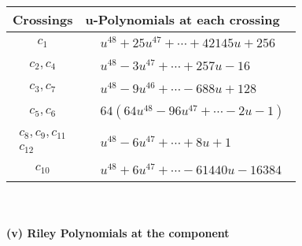 \documentclass[1p]{elsarticle_modified}
\theoremstyle{definition}
\begin{document}
\begin{tabular}{m{50pt}|m{274pt}}
Crossings & \hspace{64pt}u-Polynomials at each crossing \\
\hline $$\begin{aligned}c_{1}\end{aligned}$$&$\begin{aligned}
&u^{48}+25 u^{47}+\cdots+42145 u+256
\end{aligned}$\\
\hline $$\begin{aligned}c_{2},c_{4}\end{aligned}$$&$\begin{aligned}
&u^{48}-3 u^{47}+\cdots+257 u-16
\end{aligned}$\\
\hline $$\begin{aligned}c_{3},c_{7}\end{aligned}$$&$\begin{aligned}
&u^{48}-9 u^{46}+\cdots-688 u+128
\end{aligned}$\\
\hline $$\begin{aligned}c_{5},c_{6}\end{aligned}$$&$\begin{aligned}
&64(64 u^{48}-96 u^{47}+\cdots-2 u-1)
\end{aligned}$\\
\hline $$\begin{aligned}c_{8},c_{9},c_{11}\\c_{12}\end{aligned}$$&$\begin{aligned}
&u^{48}-6 u^{47}+\cdots+8 u+1
\end{aligned}$\\
\hline $$\begin{aligned}c_{10}\end{aligned}$$&$\begin{aligned}
&u^{48}+6 u^{47}+\cdots-61440 u-16384
\end{aligned}$\\
\hline
\end{tabular}\\~\\
\newpage\renewcommand{\arraystretch}{1}
\flushleft \textbf{(v) Riley Polynomials at the component}\newline \\
\end{document}
